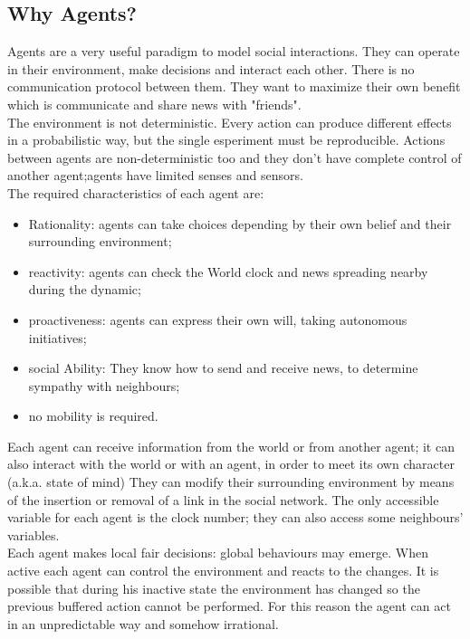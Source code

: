 \documentclass[11pt]{article} %
\begin{document}
\subsection{Why Agents?}
Agents are a very useful paradigm to model social interactions. 
They can operate in their environment, make decisions and interact each other.
There is no communication protocol between them. They want to maximize their own benefit which is
communicate and share news with "friends". \\
The environment is not deterministic. 
Every action can produce different effects in a probabilistic way, but the single esperiment must be reproducible.
Actions between agents are non-deterministic too and they don't have complete control of another
agent;agents have limited senses and sensors.
\\
The required characteristics of each agent are: \begin{itemize}
\item Rationality: agents can take choices depending by their own belief and their surrounding environment;
\item reactivity: agents can check the World clock and news spreading nearby during the dynamic;
\item proactiveness:  agents can express their own will, taking autonomous initiatives;
\item social Ability: They know how to send and receive news, to determine sympathy with neighbours;
\item no mobility is required. 
\end{itemize}

Each agent can receive information from the world or from another agent; it can also interact with 
the world or with an agent, in order to meet its own character (a.k.a. state of mind) 
They can  modify their surrounding environment by means of the insertion or removal of a link in the social network.
The only accessible variable for each agent is the clock number; they can also access some neighbours' variables.
\\
Each agent makes local fair decisions: global behaviours may emerge.
When active each agent can control the environment and reacts  to the changes. 
It is possible that during his inactive state the environment has changed so the previous buffered action cannot be performed.
For this reason the agent can act in an unpredictable way and somehow irrational.





\end{document}

